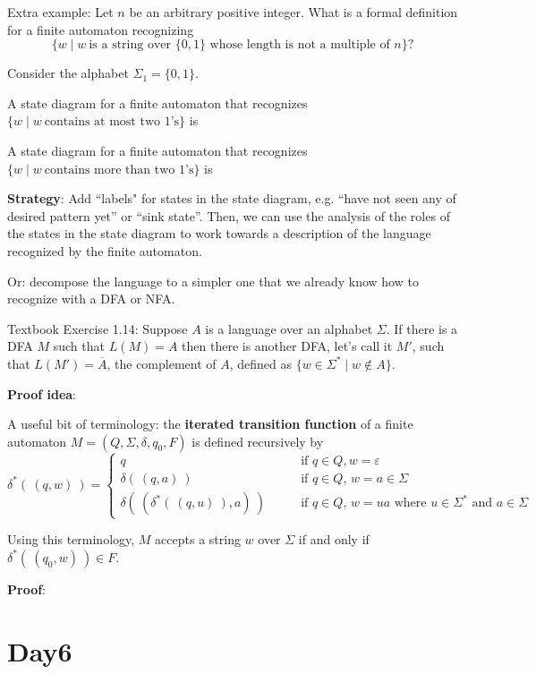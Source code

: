 \documentclass[12pt, oneside]{article}
\begin{document}
Extra example: Let $n$ be an arbitrary positive integer. What is a formal definition for a finite automaton recognizing
\[
\{w \mid w~\text{is a string over $\{0,1\}$ whose length is not a multiple of $n$} \}?
\]

\newpage

Consider the alphabet $\Sigma_1 = \{0,1\}$.

A state diagram for a finite automaton that recognizes $\{w \mid w~\text{contains at most two $1$'s} \}$ is

\vfill
A state diagram for a finite automaton that recognizes $\{w \mid w~\text{contains more than two $1$'s} \}$ is

\vfill

\textbf{Strategy}: Add ``labels" for states in the state diagram, 
e.g. ``have not seen any of desired pattern yet'' or
``sink state''. Then, we can use the analysis of the roles of the states in the 
state diagram to work towards a description of the language recognized
by the finite automaton.


\vfill
\newpage
Or: decompose the language to a simpler one 
that we already know how to recognize with a DFA or NFA.


Textbook Exercise 1.14: 
Suppose $A$ is a language over an alphabet $\Sigma$. 
If there is a DFA $M$ such that $L(M) = A$ then there is another DFA, let's call it $M'$, such that 
$L(M') = \overline{A}$, the complement of $A$, defined as $\{ w \in \Sigma^* \mid w \notin A \}$.


{\bf Proof idea}:


\vfill
A useful bit of terminology: the {\bf iterated transition function} of a finite automaton
$M = (Q, \Sigma, \delta, q_0, F)$ is defined recursively by
\[
\delta^* (~(q,w)~) 
=\begin{cases}
q  \qquad &\text{if $q \in Q, w = \varepsilon$} \\
\delta( ~(q,a)~) \qquad &\text{if $q \in Q$, $w = a \in \Sigma$ } \\
\delta(~(\delta^*(~(q,u)~), a) ~) \qquad &\text{if $q \in Q$, $w = ua$ where $u \in  \Sigma^*$ and $a \in \Sigma$}
\end{cases}
\]

Using  this terminology, $M$ accepts a string $w$ over $\Sigma$ if and only if $\delta^*( ~(q_0,w)~) \in F$.


{\bf Proof}: 
\vfill

 \vfill
\section*{Day6}
\end{document}
